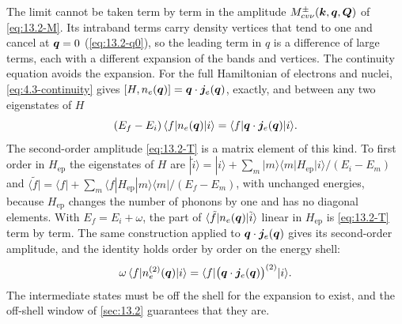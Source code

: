 The limit cannot be taken term by term in the amplitude $M^\pm_{cv\nu}(\bm{k},\bm{q},\bm{Q})$ of \cref{eq:13.2-M}. Its intraband terms carry density vertices that tend to one and cancel at $\bm{q} = 0$ (\cref{eq:13.2-q0}), so the leading term in $q$ is a difference of large terms, each with a different expansion of the bands and vertices. The continuity equation avoids the expansion. For the full Hamiltonian of electrons and nuclei, \cref{eq:4.3-continuity} gives $[H, n_e(\bm{q})] = \bm{q}\cdot\bm{j}_e(\bm{q})$, exactly, and between any two eigenstates of $H$
\begin{equation*}
  (E_f - E_i)\,\langle f|n_e(\bm{q})|i\rangle = \langle f|\bm{q}\cdot\bm{j}_e(\bm{q})|i\rangle .
\end{equation*}
The second-order amplitude \cref{eq:13.2-T} is a matrix element of this kind. To first order in $H_{\mathrm{ep}}$ the eigenstates of $H$ are $|\tilde i\rangle = |i\rangle + \sum_m|m\rangle\langle m|H_{\mathrm{ep}}|i\rangle/(E_i - E_m)$ and $\langle\tilde f| = \langle f| + \sum_m\langle f|H_{\mathrm{ep}}|m\rangle\langle m|/(E_f - E_m)$, with unchanged energies, because $H_{\mathrm{ep}}$ changes the number of phonons by one and has no diagonal elements. With $E_f = E_i + \omega$, the part of $\langle\tilde f|n_e(\bm{q})|\tilde i\rangle$ linear in $H_{\mathrm{ep}}$ is \cref{eq:13.2-T} term by term. The same construction applied to $\bm{q}\cdot\bm{j}_e(\bm{q})$ gives its second-order amplitude, and the identity holds order by order on the energy shell:
\begin{equation}
  \omega\,\langle f|n_e^{(2)}(\bm{q})|i\rangle = \langle f|\bigl(\bm{q}\cdot\bm{j}_e(\bm{q})\bigr)^{(2)}|i\rangle .
  \label{eq:13.5-ward}
\end{equation}
The intermediate states must be off the shell for the expansion to exist, and the off-shell window of \cref{sec:13.2} guarantees that they are.

